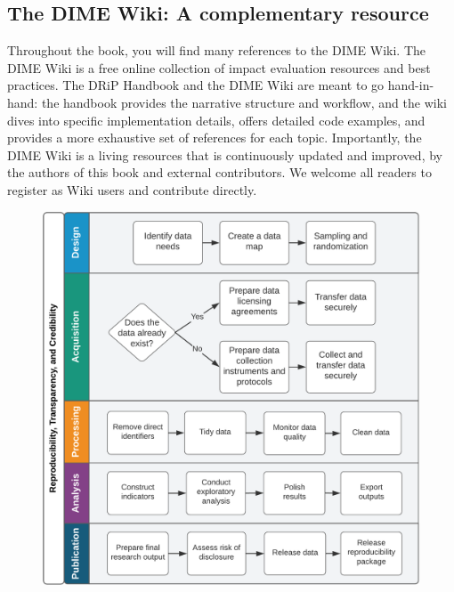 \subsection{The DIME Wiki: A complementary resource}
Throughout the book, you will find many references to the DIME Wiki.
The DIME Wiki is a free online collection of impact evaluation resources and best practices. 
The DRiP Handbook and the DIME Wiki are meant to go hand-in-hand: 
the handbook provides the narrative structure and workflow, 
and the wiki dives into specific implementation details,
offers detailed code examples, and 
provides a more exhaustive set of references for each topic. 
Importantly, the DIME Wiki is a living resources that is 
continuously updated and improved,
by the authors of this book and external contributors.
We welcome all readers to register as Wiki users and contribute directly. 


\begin{fullwidth}
	\begin{figure}
		\centering
		\includegraphics[width=1.5\linewidth]{diagrams/Introduction}
		\label{fig:intro}
	\end{figure}
\end{fullwidth}

